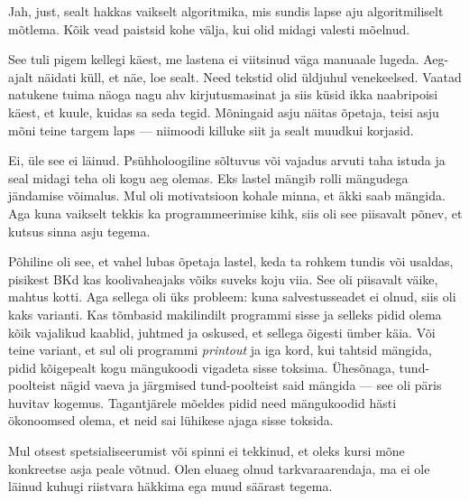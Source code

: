 
Jah, just, sealt hakkas vaikselt algoritmika, mis
sundis lapse aju algoritmiliselt mõtlema. Kõik vead paistsid kohe 
välja, kui olid midagi valesti mõelnud. 


See tuli pigem kellegi käest, me lastena ei viitsinud väga
manuaale lugeda. Aeg-ajalt näidati küll, et näe, loe sealt. Need tekstid olid üldjuhul venekeelsed. Vaatad natukene tuima näoga nagu ahv kirjutusmasinat ja siis 
küsid ikka naabripoisi käest, et kuule, kuidas sa seda tegid. 
Mõningaid asju näitas õpetaja, teisi asju mõni teine targem laps --- niimoodi killuke siit ja sealt muudkui korjasid. 


Ei, üle see ei läinud. Psühholoogiline sõltuvus või 
vajadus arvuti taha istuda ja seal midagi teha oli kogu aeg olemas. 
Eks lastel mängib rolli mängudega jändamise võimalus. Mul oli motivatsioon kohale minna, et äkki saab mängida. Aga 
kuna vaikselt tekkis ka programmeerimise kihk, siis oli see 
piisavalt põnev, et kutsus sinna asju tegema. 

Põhiline oli see, et vahel lubas õpetaja lastel, keda ta rohkem tundis või 
usaldas, pisikest BKd kas koolivaheajaks võiks suveks koju viia. See
oli piisavalt väike, mahtus kotti. Aga sellega oli üks probleem: 
kuna salvestusseadet ei olnud, siis oli 
kaks varianti. Kas tõmbasid makilindilt programmi sisse ja selleks pidid olema
kõik vajalikud kaablid, juhtmed ja oskused, et sellega õigesti 
ümber käia. Või teine variant, et sul oli programmi \emph{printout} ja iga 
kord, kui tahtsid mängida, pidid kõigepealt kogu mängukoodi 
vigadeta sisse toksima. Ühesõnaga, tund-poolteist nägid vaeva ja 
järgmised tund-poolteist said mängida --- see oli päris huvitav kogemus. 
Tagantjärele mõeldes pidid need mängukoodid hästi ökonoomsed olema, et neid sai lühikese ajaga 
sisse toksida. 


Mul otsest spetsialiseerumist või 
spinni ei tekkinud, et oleks kursi mõne konkreetse 
asja peale võtnud. Olen eluaeg olnud tarkvaraarendaja, ma ei ole 
läinud kuhugi riistvara häkkima ega muud säärast tegema. 

